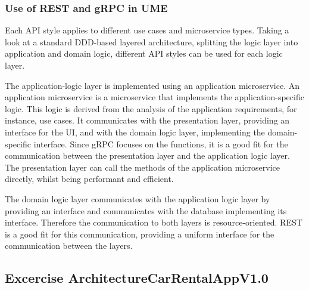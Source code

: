 \subsubsection*{Use of REST and gRPC in UME}
Each API style applies to different use cases and microservice types.
Taking a look at a standard DDD-based layered architecture, splitting the logic layer into application and domain logic, different API styles can be used for each logic layer.

The application-logic layer is implemented using an application microservice.
An application microservice is a microservice that implements the application-specific logic.
This logic is derived from the analysis of the application requirements, for instance, use cases.
It communicates with the presentation layer, providing an interface for the UI, and with the domain logic layer, implementing the domain-specific interface.
Since gRPC focuses on the functions, it is a good fit for the communication between the presentation layer and the application logic layer.
The presentation layer can call the methods of the application microservice directly, whilst being performant and efficient.

The domain logic layer communicates with the application logic layer by providing an interface and communicates with the database implementing its interface.
Therefore the communication to both layers is resource-oriented.
REST is a good fit for this communication, providing a uniform interface for the communication between the layers.

\subsection{Excercise ArchitectureCarRentalAppV1.0}
\label{sec:architecture_car_rental_app_v1_0}
